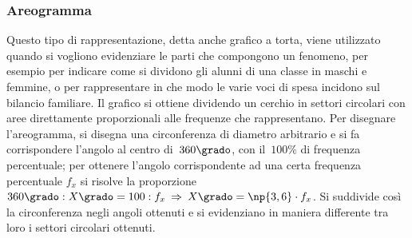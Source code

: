 \subsubsection{Areogramma}

Questo tipo di rappresentazione, detta anche grafico a torta, viene utilizzato quando si vogliono evidenziare le parti che compongono un fenomeno, per esempio per indicare
come si dividono gli alunni di una classe in maschi e femmine, o per rappresentare in che modo
le varie voci di spesa incidono sul bilancio familiare.
Il grafico si ottiene dividendo un cerchio in settori circolari con aree direttamente proporzionali alle frequenze che rappresentano.
Per disegnare l'areogramma, si disegna una circonferenza di diametro arbitrario e si fa corrispondere l'angolo al centro di~$360\grado$,
con il~$100\%$ di frequenza percentuale; per ottenere l'angolo corrispondente ad una certa frequenza percentuale $f_x$ si risolve la proporzione~$360\grado:X\grado=100:f_x\:\Rightarrow\:X\grado = \np{3,6} \cdot f_x$.
Si suddivide così la circonferenza negli angoli ottenuti e si evidenziano in maniera differente tra loro i settori circolari ottenuti.

